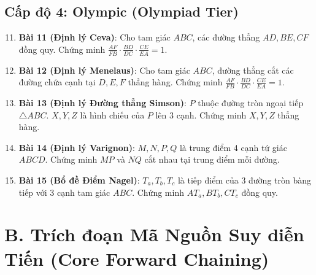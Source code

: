 \subsection*{Cấp độ 4: Olympic (Olympiad Tier)}
\begin{enumerate}
    \setcounter{enumi}{10}
    \item \textbf{Bài 11 (Định lý Ceva)}: Cho tam giác $ABC$, các đường thẳng $AD, BE, CF$ đồng quy. Chứng minh $\frac{AF}{FB} \cdot \frac{BD}{DC} \cdot \frac{CE}{EA} = 1$.
    \item \textbf{Bài 12 (Định lý Menelaus)}: Cho tam giác $ABC$, đường thẳng cắt các đường chứa cạnh tại $D, E, F$ thẳng hàng. Chứng minh $\frac{AF}{FB} \cdot \frac{BD}{DC} \cdot \frac{CE}{EA} = 1$.
    \item \textbf{Bài 13 (Định lý Đường thẳng Simson)}: $P$ thuộc đường tròn ngoại tiếp $\triangle ABC$. $X, Y, Z$ là hình chiếu của $P$ lên 3 cạnh. Chứng minh $X, Y, Z$ thẳng hàng.
    \item \textbf{Bài 14 (Định lý Varignon)}: $M, N, P, Q$ là trung điểm 4 cạnh tứ giác $ABCD$. Chứng minh $MP$ và $NQ$ cắt nhau tại trung điểm mỗi đường.
    \item \textbf{Bài 15 (Bổ đề Điểm Nagel)}: $T_a, T_b, T_c$ là tiếp điểm của 3 đường tròn bàng tiếp với 3 cạnh tam giác $ABC$. Chứng minh $AT_a, BT_b, CT_c$ đồng quy.
\end{enumerate}

\section*{B. Trích đoạn Mã Nguồn Suy diễn Tiến (Core Forward Chaining)}

